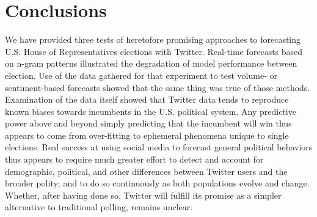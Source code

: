 \documentclass{sig-alternate-2013}
\begin{document}
\section{Conclusions}
\label{sec:conclusions}

We have provided three tests of heretofore promising approaches to
forecasting U.S. House of Representatives elections with
Twitter. Real-time forecasts based on n-gram patterns illustrated the
degradation of model performance between election. Use of the data
gathered for that experiment to test volume- or sentiment-based
forecasts showed that the same thing was true of those
methods. Examination of the data itself showed that Twitter data tends
to reproduce known biases towards incumbents in the U.S. political
system. Any predictive power above and beyond simply predicting that
the incumbent will win thus appears to come from over-fitting to
ephemeral phenomena unique to single elections. Real success at using
social media to forecast general political behaviors thus appears to
require much greater effort to detect and account for demographic,
political, and other differences between Twitter users and the broader
polity; and to do so continuously as both populations evolve and
change. Whether, after having done so, Twitter will fulfill its
promise as a simpler alternative to traditional polling, remains unclear.








\end{document}
